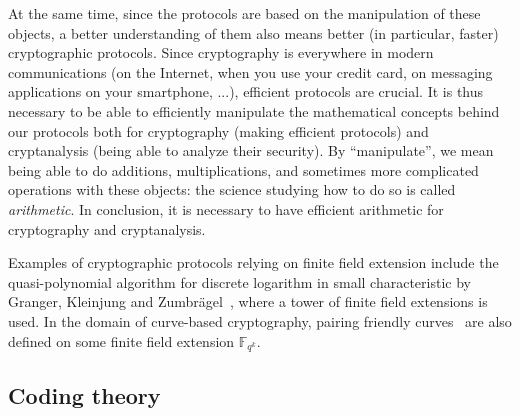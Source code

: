 At the same time, since the protocols are based on the manipulation of these
objects, a better understanding of them also means better (in particular,
faster) cryptographic protocols. Since cryptography is everywhere in modern
communications (on the Internet, when you use your credit card, on messaging
applications on your smartphone, ...), efficient protocols are crucial. It is
thus necessary to be able to efficiently manipulate the mathematical concepts
behind our protocols both for cryptography (making efficient protocols) and
cryptanalysis (being able to analyze their security). By ``manipulate'', we mean
being able to do additions, multiplications, and sometimes more complicated
operations with these objects: the science studying how to do so is called
\emph{arithmetic}. In conclusion, it is necessary to have efficient arithmetic
for cryptography and cryptanalysis.

Examples of cryptographic protocols relying on finite field extension include
the quasi-polynomial algorithm for discrete logarithm in small characteristic by
Granger, Kleinjung and Zumbrägel~\cite{GKZ14}, where a tower of finite field
extensions is used. In the domain of curve-based cryptography, pairing friendly
curves~\cite{Joux00, FST10} are also defined on some finite field extension
$\mathbb{F}_{q^k}$.

\subsection*{Coding theory}
\label{sec:coding}

